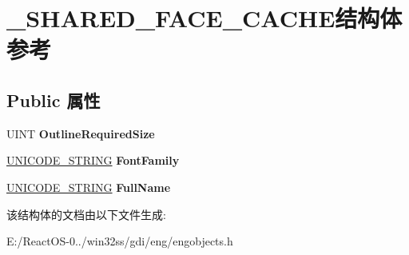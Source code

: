 \hypertarget{struct___s_h_a_r_e_d___f_a_c_e___c_a_c_h_e}{}\section{\+\_\+\+S\+H\+A\+R\+E\+D\+\_\+\+F\+A\+C\+E\+\_\+\+C\+A\+C\+H\+E结构体 参考}
\label{struct___s_h_a_r_e_d___f_a_c_e___c_a_c_h_e}
\subsection*{Public 属性}
\begin{DoxyCompactItemize}
\item 
\mbox{\label{struct___s_h_a_r_e_d___f_a_c_e___c_a_c_h_e_ad9d41691e239288d89f8639e37aef829}} 
U\+I\+NT {\bfseries Outline\+Required\+Size}
\item 
\mbox{\label{struct___s_h_a_r_e_d___f_a_c_e___c_a_c_h_e_a8b11356ba0dc12dcc54736882ae6a7f9}} 
\hyperlink{struct___u_n_i_c_o_d_e___s_t_r_i_n_g}{U\+N\+I\+C\+O\+D\+E\+\_\+\+S\+T\+R\+I\+NG} {\bfseries Font\+Family}
\item 
\mbox{\label{struct___s_h_a_r_e_d___f_a_c_e___c_a_c_h_e_ae5ef9069a4a9d85b588ce74514b260c6}} 
\hyperlink{struct___u_n_i_c_o_d_e___s_t_r_i_n_g}{U\+N\+I\+C\+O\+D\+E\+\_\+\+S\+T\+R\+I\+NG} {\bfseries Full\+Name}
\end{DoxyCompactItemize}


该结构体的文档由以下文件生成\+:\begin{DoxyCompactItemize}
\item 
E\+:/\+React\+O\+S-\/0../win32ss/gdi/eng/engobjects.\+h\end{DoxyCompactItemize}
